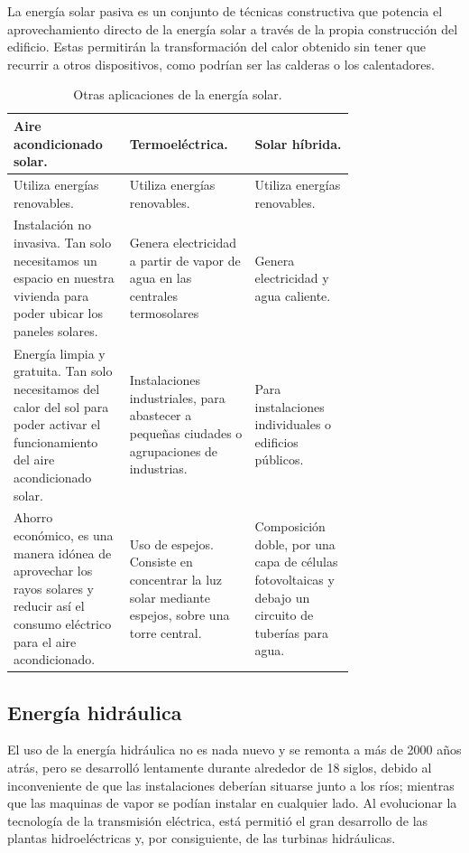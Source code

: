 \documentclass[12pt,letterpaper,superscriptaddress]{article}
\begin{document}
La energía solar pasiva es un conjunto de técnicas constructiva que potencia el aprovechamiento directo de la energía solar a través de la propia construcción del edificio. Estas permitirán la transformación del calor obtenido sin tener que recurrir a otros dispositivos, como podrían ser las calderas o los calentadores.


\begin{table}[h]
\begin{center}

\begin{tabular}{|m{0.25\linewidth}|m{0.25\linewidth}|m{0.25\linewidth}|}
\hline 
\textbf{Aire acondicionado solar.} & \textbf{Termoeléctrica.} & \textbf{Solar híbrida.} \\ 
\hline 
Utiliza energías renovables. & Utiliza energías renovables. & Utiliza energías renovables. \\ 
\hline 
Instalación no invasiva. Tan solo necesitamos un espacio en nuestra vivienda para poder ubicar los paneles solares. & Genera electricidad a partir de vapor de agua en las centrales termosolares & Genera electricidad y agua caliente. \\ 
\hline 
Energía limpia y gratuita. Tan solo necesitamos del calor del sol para poder activar el funcionamiento del aire acondicionado solar. & Instalaciones industriales, para abastecer a pequeñas ciudades o agrupaciones de industrias. & Para instalaciones individuales o edificios públicos. \\ 
\hline 
Ahorro económico, es una manera idónea de aprovechar los rayos solares y reducir así el consumo eléctrico para el aire acondicionado. & Uso de espejos. Consiste en concentrar la luz solar mediante espejos, sobre una torre central. & Composición doble, por una capa de células fotovoltaicas y debajo un circuito de tuberías para agua. \\ 
\hline 
\end{tabular} 

\caption{Otras aplicaciones de la energía solar.}
\label{otras_ap_solar}
\end{center}
\end{table}


\subsection{Energía hidráulica}

El uso de la energía hidráulica no es nada nuevo y se remonta a más de 2000 años atrás, pero se desarrolló lentamente durante alrededor de 18 siglos, debido al inconveniente de que las instalaciones deberían situarse junto a los ríos; mientras que las maquinas de vapor se podían instalar en cualquier lado. Al evolucionar la tecnología de la transmisión eléctrica, está permitió el gran desarrollo de las plantas hidroeléctricas y, por consiguiente, de las turbinas hidráulicas.
\end{document}
